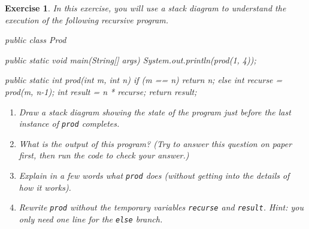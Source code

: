 \documentclass[12pt]{book}
\theoremstyle{exercise}
\newtheorem{exercise}{Exercise}[chapter]
\newcommand{\java}[1]{\verb"#1"}
\begin{document}
\begin{exercise}

In this exercise, you will use a stack diagram to understand the execution of the following recursive program.

\begin{code}
public class Prod {

    public static void main(String[] args) {
        System.out.println(prod(1, 4));
    }

    public static int prod(int m, int n) {
        if (m == n) {
            return n;
        } else {
            int recurse = prod(m, n-1);
            int result = n * recurse;
            return result;
        }
    }
}
\end{code}

\begin{enumerate}

\item Draw a stack diagram showing the state of the program just before the last instance of \java{prod} completes.

\item What is the output of this program?
(Try to answer this question on paper first, then run the code to check your answer.)

\item Explain in a few words what \java{prod} does (without getting into the details of how it works).

\item Rewrite \java{prod} without the temporary variables \java{recurse} and \java{result}.
Hint: you only need one line for the \java{else} branch.

\end{enumerate}

\end{exercise}


\end{document}

